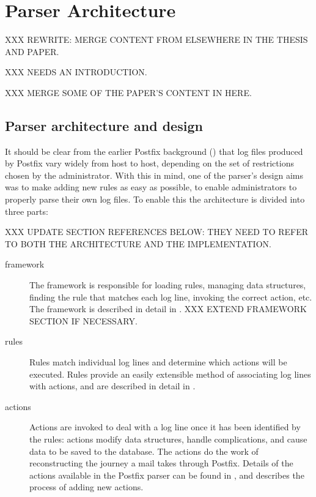 \chapter{Parser Architecture}

XXX REWRITE\@: MERGE CONTENT FROM ELSEWHERE IN THE THESIS AND PAPER\@.

XXX NEEDS AN INTRODUCTION\@.

XXX MERGE SOME OF THE PAPER'S CONTENT IN HERE\@.

\section{Parser architecture and design}

\label{parser design}

It should be clear from the earlier Postfix background () that log files produced by Postfix vary widely from host to
host, depending on the set of restrictions chosen by the administrator.
With this in mind, one of the parser's design aims was to make adding new
rules as easy as possible, to enable administrators to properly parse their
own log files.  To enable this the architecture is divided into three
parts:

XXX UPDATE SECTION REFERENCES BELOW\@: THEY NEED TO REFER TO BOTH THE
ARCHITECTURE AND THE IMPLEMENTATION\@.

\begin{description}

    \item [framework] The framework is responsible for loading rules,
        managing data structures, finding the rule that matches each log
        line, invoking the correct action, etc\@.  The framework is
        described in detail in .  XXX EXTEND
        FRAMEWORK SECTION IF NECESSARY\@.

    \item [rules] Rules match individual log lines and determine which
        actions will be executed.  Rules provide an easily extensible
        method of associating log lines with actions, and are described in
        detail in .

    \item [actions] Actions are invoked to deal with a log line once it has
        been identified by the rules: actions modify data structures,
        handle complications, and cause data to be saved to the database.
        The actions do the work of reconstructing the journey a mail takes
        through Postfix.  Details of the actions available in the Postfix
        parser can be found in , and
         describes the process of adding new
        actions.

\end{description}

